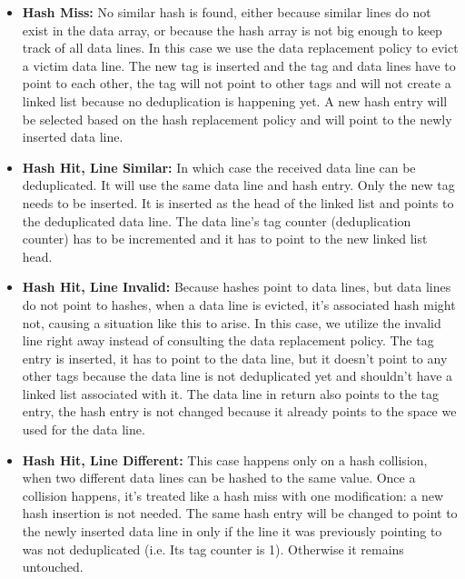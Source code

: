 \begin{itemize}
    \item \textbf{Hash Miss:} No similar hash is found, either because similar lines do not exist in the data array, or because the hash array is not big enough to keep track of all data lines. In this case we use the data replacement policy to evict a victim data line. The new tag is inserted and the tag and data lines have to point to each other, the tag will not point to other tags and will not create a linked list because no deduplication is happening yet. A new hash entry will be selected based on the hash replacement policy and will point to the newly inserted data line.
    \item \textbf{Hash Hit, Line Similar:} In which case the received data line can be deduplicated. It will use the same data line and hash entry. Only the new tag needs to be inserted. It is inserted as the head of the linked list and points to the deduplicated data line. The data line's tag counter (deduplication counter) has to be incremented and it has to point to the new linked list head.
    \item \textbf{Hash Hit, Line Invalid:} Because hashes point to data lines, but data lines do not point to hashes, when a data line is evicted, it's associated hash might not, causing a situation like this to arise. In this case, we utilize the invalid line right away instead of consulting the data replacement policy. The tag entry is inserted, it has to point to the data line, but it doesn't point to any other tags because the data line is not deduplicated yet and shouldn't have a linked list associated with it. The data line in return also points to the tag entry, the hash entry is not changed because it already points to the space we used for the data line.
    \item \textbf{Hash Hit, Line Different:} This case happens only on a hash collision, when two different data lines can be hashed to the same value. Once a collision happens, it's treated like a hash miss with one modification: a new hash insertion is not needed. The same hash entry will be changed to point to the newly inserted data line in only if the line it was previously pointing to was not deduplicated (i.e. Its tag counter is 1). Otherwise it remains untouched.
\end{itemize}

